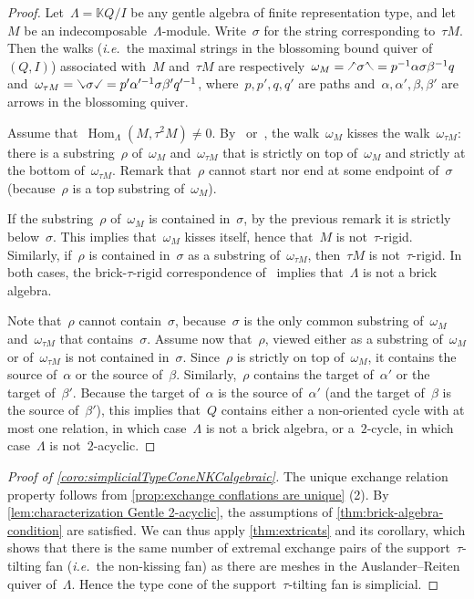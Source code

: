 \documentclass{amsart}
\theoremstyle{definition}
\newcommand{\ie}{\textit{i.e.}~} %
\newcommand{\hL}{\text{\rotatebox[origin=c]{180}{\checked}}}
\newcommand{\hR}{\text{\rotatebox[origin=c]{180}{\reflectbox{\checked}}}}
\newcommand{\cL}{\text{\reflectbox{\checked}}}
\newcommand{\cR}{\text{\checked}}
\newcommand{\hh}[1]{\hL#1\hR} %
\newcommand{\cc}[1]{\cL#1\cR} %
\newcommand{\field}{\mathbb{K}}
\newcommand{\Hom}[1]{\operatorname{Hom}_{#1}}
\begin{document}
\begin{proof}
Let~$\Lambda=\field Q / I$ be any gentle algebra of finite representation type, and let~$M$ be an indecomposable~$\Lambda$-module.
Write~$\sigma$ for the string corresponding to~$\tau M$.
Then the walks (\ie the maximal strings in the blossoming bound quiver of~$(Q,I)$) associated with~$M$ and~$\tau M$ are respectively~$\omega_M = \hh\sigma = p^{-1}\alpha\sigma\beta^{-1}q$ and~$\omega_{\tau M}=\cc\sigma=p'\alpha'^{-1}\sigma\beta'q'^{-1}$, where~$p,p',q,q'$ are paths and~$\alpha,\alpha',\beta,\beta'$ are arrows in the blossoming quiver.


Assume that~$\Hom{\Lambda}(M,\tau^2 M)\neq0$.
By~\cite[Theorem 2.46]{PaluPilaudPlamondon-nonkissing} or~\cite[Theorem 5.1]{BrustleDouvilleMousavandThomasYildirim}, the walk~$\omega_M$ kisses the walk~$\omega_{\tau M}$: there is a substring~$\rho$ of~$\omega_M$ and~$\omega_{\tau M}$ that is strictly on top of~$\omega_M$ and strictly at the bottom of~$\omega_{\tau M}$. Remark that~$\rho$ cannot start nor end at some endpoint of~$\sigma$ (because~$\rho$ is a top substring of~$\omega_M$).
 
If the substring~$\rho$ of~$\omega_M$ is contained in~$\sigma$, by the previous remark it is strictly below~$\sigma$. This implies that~$\omega_M$ kisses itself, hence that~$M$ is not~$\tau$-rigid. Similarly, if~$\rho$ is contained in~$\sigma$ as a substring of~$\omega_{\tau M}$, then~$\tau M$ is not~$\tau$-rigid. In both cases, the brick-$\tau$-rigid correspondence of~\cite{DemonetIyamaJasso} implies that~$\Lambda$ is not a brick algebra.
 
Note that~$\rho$ cannot contain~$\sigma$, because~$\sigma$ is the only common substring of~$\omega_M$ and~$\omega_{\tau M}$ that contains~$\sigma$.
Assume now that~$\rho$, viewed either as a substring of~$\omega_M$ or of~$\omega_{\tau M}$ is not contained in~$\sigma$.
Since~$\rho$ is strictly on top of~$\omega_M$, it contains the source of~$\alpha$ or the source of~$\beta$.
Similarly,~$\rho$ contains the target of~$\alpha'$ or the target of~$\beta'$.
Because the target of~$\alpha$ is the source of~$\alpha'$ (and the target of~$\beta$ is the source of~$\beta'$), this implies that~$Q$ contains either a non-oriented cycle with at most one relation, in which case~$\Lambda$ is not a brick algebra, or a~$2$-cycle, in which case~$\Lambda$ is not~$2$-acyclic.
\end{proof}

\begin{proof}[Proof of \cref{coro:simplicialTypeConeNKCalgebraic}]
The unique exchange relation property follows from \cref{prop:exchange conflations are unique} (2).
By \cref{lem:characterization Gentle 2-acyclic}, the assumptions of \cref{thm:brick-algebra-condition} are satisfied.
We can thus apply \cref{thm:extricats} and its corollary, which shows that there is the same number of extremal exchange pairs of the support~$\tau$-tilting fan (\ie the non-kissing fan) as there are meshes in the Auslander--Reiten quiver of~$\Lambda$.
Hence the type cone of the support~$\tau$-tilting fan is simplicial.
\end{proof}
\end{document}
